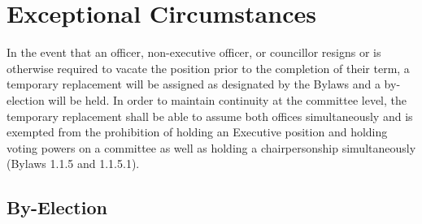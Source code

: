 \section{Exceptional Circumstances}
In the event that an officer, non-executive officer, or councillor resigns or is otherwise required to vacate the position prior to the completion of their term, a temporary replacement will be assigned as designated by the Bylaws and a by-election will be held. In order to maintain continuity at the committee level, the temporary replacement shall be able to assume both offices simultaneously and is exempted from the prohibition of holding an Executive position and holding voting powers on a committee as well as holding a chairpersonship simultaneously (Bylaws 1.1.5 and 1.1.5.1).

\subsection {By-Election}

